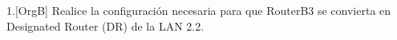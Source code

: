 \begin{ejer}
1.[OrgB] Realice la configuración necesaria para que RouterB3 se convierta
en Designated Router (DR) de la LAN 2.2.
\end{ejer}